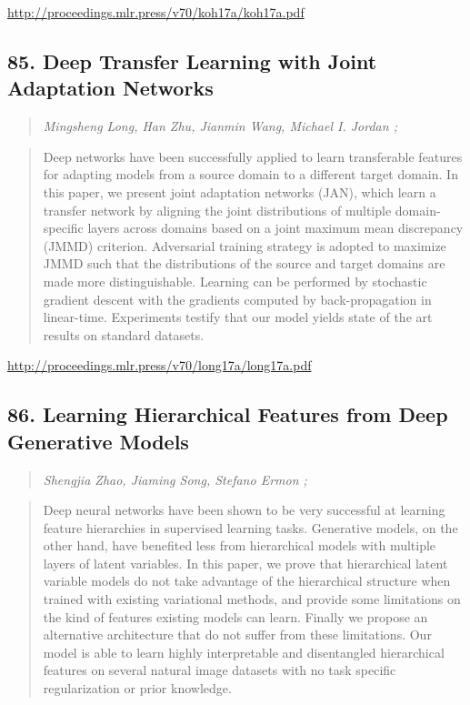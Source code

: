 \documentclass{article}
\begin{document}
\href{http://proceedings.mlr.press/v70/koh17a/koh17a.pdf}{http://proceedings.mlr.press/v70/koh17a/koh17a.pdf}

\subsection{85. Deep Transfer Learning with Joint Adaptation Networks}

\begin{quote}
\footnotesize{\textit{Mingsheng Long, Han Zhu, Jianmin Wang, Michael I. Jordan ;}}
\end{quote}

\begin{quote}
    Deep networks have been successfully applied to learn transferable features for adapting models from a source domain to a different target domain. In this paper, we present joint adaptation networks (JAN), which learn a transfer network by aligning the joint distributions of multiple domain-specific layers across domains based on a joint maximum mean discrepancy (JMMD) criterion. Adversarial training strategy is adopted to maximize JMMD such that the distributions of the source and target domains are made more distinguishable. Learning can be performed by stochastic gradient descent with the gradients computed by back-propagation in linear-time. Experiments testify that our model yields state of the art results on standard datasets.  \end{quote}

\href{http://proceedings.mlr.press/v70/long17a/long17a.pdf}{http://proceedings.mlr.press/v70/long17a/long17a.pdf}

\subsection{86. Learning Hierarchical Features from Deep Generative Models}

\begin{quote}
\footnotesize{\textit{Shengjia Zhao, Jiaming Song, Stefano Ermon ;}}
\end{quote}

\begin{quote}
    Deep neural networks have been shown to be very successful at learning feature hierarchies in supervised learning tasks. Generative models, on the other hand, have benefited less from hierarchical models with multiple layers of latent variables. In this paper, we prove that hierarchical latent variable models do not take advantage of the hierarchical structure when trained with existing variational methods, and provide some limitations on the kind of features existing models can learn. Finally we propose an alternative architecture that do not suffer from these limitations. Our model is able to learn highly interpretable and disentangled hierarchical features on several natural image datasets with no task specific regularization or prior knowledge.  \end{quote}
\end{document}
